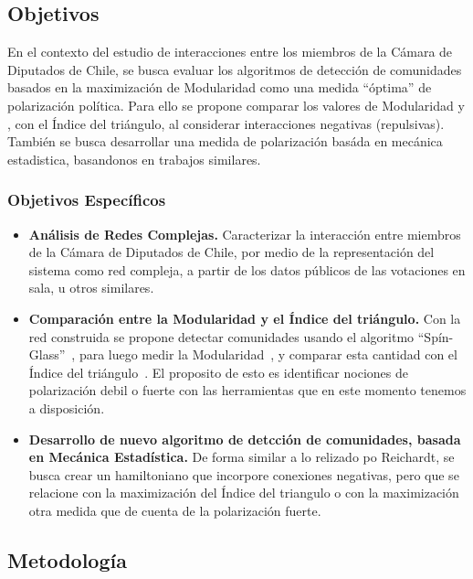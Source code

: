 \documentclass{proyectotesis}
\begin{document}
\subsection{Objetivos}

En el contexto del estudio de interacciones entre los miembros de la Cámara de Diputados de Chile, se busca evaluar los algoritmos de detección de comunidades basados en la maximización de Modularidad como una medida ``óptima'' de polarización política. Para ello se propone comparar los valores de Modularidad y , con el Índice del triángulo, al considerar interacciones negativas (repulsivas). 
También se busca desarrollar una medida de polarización basáda en mecánica estadistica, basandonos en trabajos similares.

\subsubsection*{Objetivos Específicos}
\begin{itemize}
\item    {\bf Análisis de Redes Complejas.} Caracterizar la interacción entre miembros de la Cámara de Diputados de Chile, por medio de la representación del sistema como red compleja, a partir de los datos públicos de las votaciones en sala, u otros similares.

\item{\bf Comparación entre la Modularidad y el Índice del triángulo.} Con la red construida se propone detectar comunidades usando el algoritmo ``Spín-Glass''~\cite{Reichardt_2006}, para luego medir la Modularidad~\cite{NewmanGirvan_2004}, y comparar esta cantidad con el Índice del triángulo~\cite{Aref_2018}. El proposito de esto es identificar nociones de polarización debil o fuerte con las herramientas que en este momento tenemos a disposición.

\item {\bf Desarrollo de nuevo algoritmo de detcción de comunidades, basada en Mecánica Estadística.} De forma similar a lo relizado po Reichardt, se busca crear un hamiltoniano que incorpore conexiones negativas, pero que se relacione con la maximización del Índice del triangulo o con la maximización otra medida que de cuenta de la polarización fuerte.

\end{itemize}

\subsection{Metodología}
\end{document}
